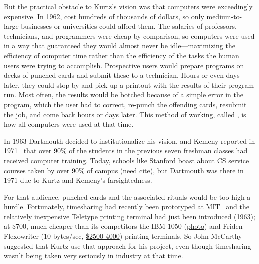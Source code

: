 \documentclass{article}
\begin{document}
But the practical obstacle to Kurtz's vision was that
computers were exceedingly expensive.  In 1962,  
cost hundreds of thousands of dollars, so only medium-to-large 
businesses or universities could afford them.  
The salaries of professors, technicians, and programmers were
cheap by comparison, so computers were used in a way that guaranteed
they would almost never be idle---maximizing the efficiency of computer
time rather than the efficiency of the tasks the human users were trying
to accomplish.
Prospective users would prepare programs on decks of punched
cards and submit these to a technician.  
Hours or even days later, they
could stop by and pick up a printout with the results of their program run.
Most often, the results would be botched because of a simple error in
the program, which the user had to correct, re-punch the offending
cards, resubmit the job, and come back hours or days later.  This method
of working, called , is how all computers were used
at that time.


In 1963 Dartmouth decided to
institutionalize his vision, and Kemeny reported in
1971~\cite{man_and_computer} that
over 90\% of the students in the previous seven freshman classes had
received computer training.  Today, schools like Stanford boast about
CS service courses taken by over 90\% of campus (need cite), but
Dartmouth was there in 1971 due to Kurtz and Kemeny's farsightedness.

For that audience, punched cards and the associated rituals would be too
high a hurdle.
Fortunately, timesharing had recently been prototyped at
MIT~\cite{corbato62timesharing} and the relatively inexpensive Teletype
 printing terminal had just been introduced (1963); at \$700,
much cheaper than its competitors the IBM 1050
(\href{http://www.science.uva.nl/museum/ibm1050.php}{photo}) and
Friden Flexowriter (10 bytes/sec,
\href{http://retrotechnology.com/herbs_stuff/flex_behr.html}{\$2500-4000})
printing terminals.
So John McCarthy suggested that Kurtz use that approach for his project,
even though timesharing wasn't being taken very seriously in industry at
that time.
\end{document}
